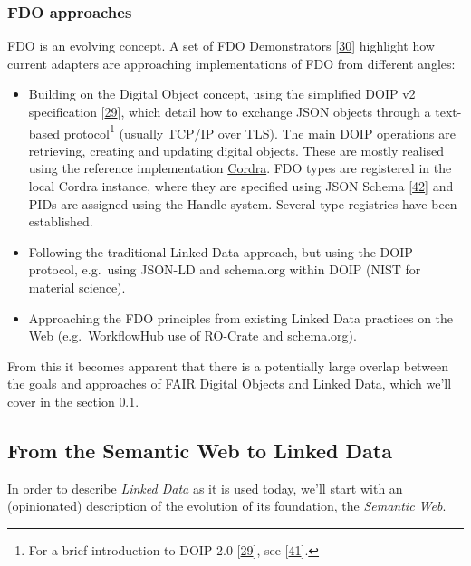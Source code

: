 \hypertarget{fdo-approaches}{%
\subsubsection{FDO approaches}\label{fdo-approaches}}

FDO is an evolving concept. A set of FDO Demonstrators {[}\protect\hyperlink{ref-jRWurmQc}{30}{]} highlight how current adapters are approaching implementations of FDO from different angles:

\begin{itemize}
\tightlist
\item
  Building on the Digital Object concept, using the simplified DOIP v2 specification {[}\protect\hyperlink{ref-13TcbsZF6}{29}{]}, which detail how to exchange JSON objects through a text-based protocol\footnote{For a brief introduction to DOIP 2.0 {[}\protect\hyperlink{ref-13TcbsZF6}{29}{]}, see {[}\protect\hyperlink{ref-xuQKRRx5}{41}{]}.} (usually TCP/IP over TLS). The main DOIP operations are retrieving, creating and updating digital objects. These are mostly realised using the reference implementation \href{https://cordra.org/}{Cordra}. FDO types are registered in the local Cordra instance, where they are specified using JSON Schema {[}\protect\hyperlink{ref-15EZ2D0Rm}{42}{]} and PIDs are assigned using the Handle system. Several type registries have been established.
\item
  Following the traditional Linked Data approach, but using the DOIP protocol, e.g.~using JSON-LD and schema.org within DOIP (NIST for material science).
\item
  Approaching the FDO principles from existing Linked Data practices on the Web (e.g.~WorkflowHub use of RO-Crate and schema.org).
\end{itemize}

From this it becomes apparent that there is a potentially large overlap between the goals and approaches of FAIR Digital Objects and Linked Data, which we'll cover in the section \ref{sec:ld}.

\hypertarget{sec:ld}{%
\subsection{From the Semantic Web to Linked Data}\label{sec:ld}}

In order to describe \emph{Linked Data} as it is used today, we'll start with an (opinionated) description of the evolution of its foundation, the \emph{Semantic Web}.

